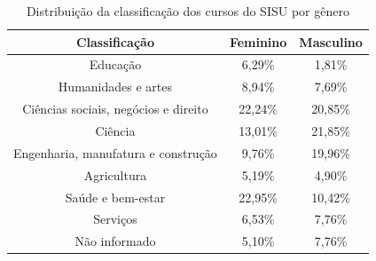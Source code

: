             \begin{table}[]
                \centering
                \begin{tabular}{ccc}
                \hline
                \textbf{Classificação}                        & \textbf{Feminino} & \textbf{Masculino} \\ \hline
                Educação                             & 6,29\%   & 1,81\%    \\ \hline
                Humanidades e artes                  & 8,94\%   & 7,69\%    \\ \hline
                Ciências sociais, negócios e direito & 22,24\%  & 20,85\%   \\ \hline
                Ciência                              & 13,01\%  & 21,85\%   \\ \hline
                Engenharia, manufatura e construção  & 9,76\%   & 19,96\%   \\ \hline
                Agricultura                          & 5,19\%   & 4,90\%    \\ \hline
                Saúde e bem-estar                    & 22,95\%  & 10,42\%   \\ \hline
                Serviços                             & 6,53\%   & 7,76\%    \\ \hline
                Não informado                        & 5,10\%   & 7,76\%    \\ \hline
                \end{tabular}
                \caption{Distribuição da classificação dos cursos do SISU por gênero}
                \label{tab:classificacao-curso-genero}
                \end{table}


